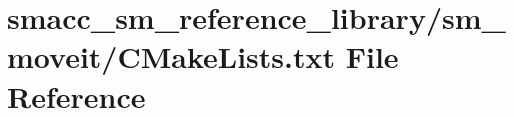 \hypertarget{sm__reference__library_2sm__moveit_2CMakeLists_8txt}{}\section{smacc\+\_\+sm\+\_\+reference\+\_\+library/sm\+\_\+moveit/\+C\+Make\+Lists.txt File Reference}
\label{sm__reference__library_2sm__moveit_2CMakeLists_8txt}
